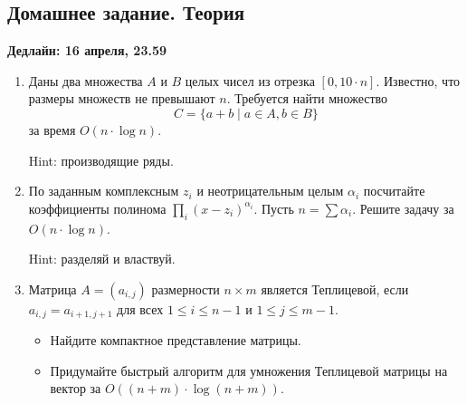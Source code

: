 \subsection{Домашнее задание. Теория}
\textbf{Дедлайн: 16 апреля, 23.59}
\begin{enumerate}

  \item Даны два множества $A$ и $B$ целых чисел из отрезка $[0, 10 \cdot n]$.
  Известно, что размеры множеств не превышают $n$. Требуется найти множество
  $$
    C = \{ a + b\;|\;a\in A, b \in B\}
  $$
  за время $O(n \cdot \log n)$.
  
  Hint: производящие ряды.


  \item По заданным комплексным $z_i$ и неотрицательным целым $\alpha_i$ посчитайте
  коэффициенты полинома $\prod_i (x - z_i)^{\alpha_i}$. Пусть $n = \sum \alpha_i$.
  Решите задачу за $O(n \cdot \log n)$.

  Hint: разделяй и властвуй.  


  \item Матрица $A = (a_{i,j})$ размерности $n \times m$ является Теплицевой, 
  если $a_{i,j} = a_{i + 1, j + 1}$ для всех $1 \leq i \leq n - 1$ и $1 \leq j \leq m - 1$.
  \begin{itemize}
    \item Найдите компактное представление матрицы.
    \item Придумайте быстрый алгоритм для умножения Теплицевой матрицы на вектор за $O((n + m) \cdot \log (n + m))$.    
  \end{itemize} 


\end{enumerate}



\clearpage
